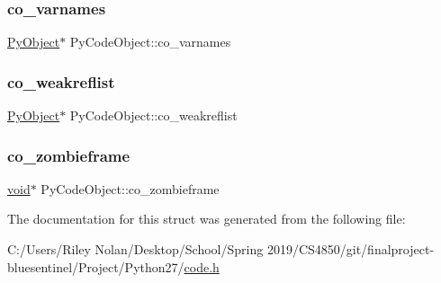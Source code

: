 \mbox{\label{struct_py_code_object_aff29dff0e2f511c562f3bc9a322321d0}} 
\subsubsection{\texorpdfstring{co\_varnames}{co\_varnames}}
{\footnotesize\ttfamily \mbox{\hyperlink{_python27_2object_8h_aadc84ac7aed2cfa6f20c25f62bf3dac7}{Py\+Object}}$\ast$ Py\+Code\+Object\+::co\+\_\+varnames}

\mbox{\label{struct_py_code_object_a0240509a49ab73c5e157dc75c2ae88d7}} 
\subsubsection{\texorpdfstring{co\_weakreflist}{co\_weakreflist}}
{\footnotesize\ttfamily \mbox{\hyperlink{_python27_2object_8h_aadc84ac7aed2cfa6f20c25f62bf3dac7}{Py\+Object}}$\ast$ Py\+Code\+Object\+::co\+\_\+weakreflist}

\mbox{\label{struct_py_code_object_ac08ff386d0019fdf3a6b455ca1e53ff9}} 
\subsubsection{\texorpdfstring{co\_zombieframe}{co\_zombieframe}}
{\footnotesize\ttfamily \mbox{\hyperlink{_s_d_l__opengles2__gl2ext_8h_ae5d8fa23ad07c48bb609509eae494c95}{void}}$\ast$ Py\+Code\+Object\+::co\+\_\+zombieframe}



The documentation for this struct was generated from the following file\+:\begin{DoxyCompactItemize}
\item 
C\+:/\+Users/\+Riley Nolan/\+Desktop/\+School/\+Spring 2019/\+C\+S4850/git/finalproject-\/bluesentinel/\+Project/\+Python27/\mbox{\hyperlink{code_8h}{code.\+h}}\end{DoxyCompactItemize}
